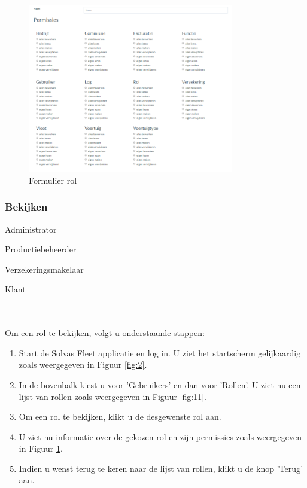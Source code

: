 \documentclass[11pt,openany]{article}
\newcommand{\cmark}{\ding{51}}%
\newcommand{\done}{\rlap{$\square$}{\raisebox{2pt}{\large\hspace{1pt}\cmark}}%
	\hspace{-2.5pt}}
\begin{document}
\begin{figure}
	\centering
	\includegraphics[width=0.8\textwidth]{img/fig12.png}
	\caption{Formulier rol} 
	\label{fig:12} 
\end{figure}
\newpage
\subsubsection{Bekijken}
\begin{todolist}
	\item[\done] Administrator
	\item[\done] Productiebeheerder
	\item[\done] Verzekeringsmakelaar
	\item[\done] Klant 
\end{todolist}
\\
\\
Om een rol te bekijken, volgt u onderstaande stappen:
\begin{enumerate}
	\item Start de Solvas Fleet applicatie en log in. U ziet het startscherm gelijkaardig zoals weergegeven in Figuur \ref{fig:2}.
	\item In de bovenbalk kiest u voor 'Gebruikers' en dan voor 'Rollen'. U ziet nu een lijst van rollen zoals weergegeven in Figuur \ref{fig:11}.
	\item Om een rol te bekijken, klikt u de desgewenste rol aan.
	\item U ziet nu informatie over de gekozen rol en zijn permissies zoals weergegeven in Figuur \ref{fig:12}. 
	\item Indien u wenst terug te keren naar de lijst van rollen, klikt u de knop 'Terug' aan.
\end{enumerate}
\end{document}
